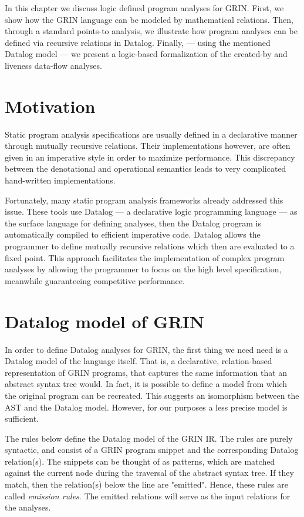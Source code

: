 \documentclass[main.tex]{subfiles}
\begin{document}
  In this chapter we discuss logic defined program analyses for GRIN. First, we show how the GRIN language can be modeled by mathematical relations. Then, through a standard points-to analysis, we illustrate how program analyses can be defined via recursive relations in Datalog. Finally, --- using the mentioned Datalog model --- we present a logic-based formalization of the created-by and liveness data-flow analyses.

	\section{Motivation}
	
	Static program analysis specifications are usually defined in a declarative manner through mutually recursive relations. Their implementations however, are often given in an imperative style in order to maximize performance. This discrepancy between the denotational and operational semantics leads to very complicated hand-written implementations.
	
	Fortunately, many static program analysis frameworks \cite{doop, cclyzer, souffle-2} already addressed this issue. These tools use Datalog --- a declarative logic programming language --- as the surface language for defining analyses, then the Datalog program is automatically compiled to efficient imperative code. Datalog allows the programmer to define mutually recursive relations which then are evaluated to a fixed point. This approach facilitates the implementation of complex program analyses by allowing the programmer to focus on the high level specification, meanwhile guaranteeing competitive performance.

  \section{Datalog model of GRIN} \label{sec:datalog-model}
  
  In order to define Datalog analyses for GRIN, the first thing we need need is a Datalog model of the language itself. That is, a declarative, relation-based representation of GRIN programs, that captures the same information that an abstract syntax tree would. In fact, it is possible to define a model from which the original program can be recreated. This suggests an isomorphism between the AST and the Datalog model. However, for our purposes a less precise model is sufficient. 
  
  The rules below define the Datalog model of the GRIN IR. The rules are purely syntactic, and consist of a GRIN program snippet and the corresponding Datalog relation(s). The snippets can be thought of as patterns, which are matched against the current node during the traversal of the abstract syntax tree. If they match, then the relation(s) below the line are "emitted". Hence, these rules are called \emph{emission rules}. The emitted relations will serve as the input relations for the analyses.
  
\end{document}
